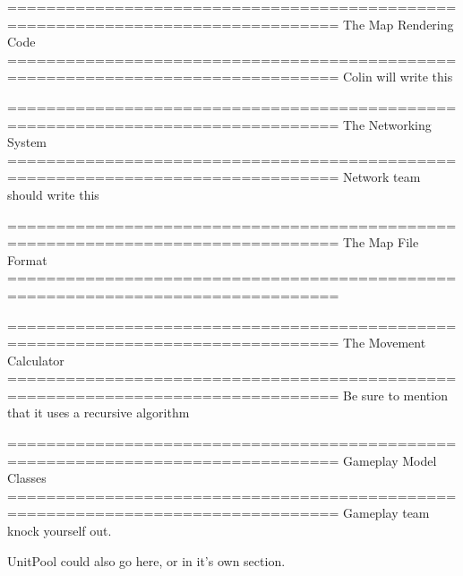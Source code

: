 \documentclass[12pt,a4paper]{article}
\begin{document}
================================================================================
The Map Rendering Code
================================================================================
Colin will write this

================================================================================
The Networking System
================================================================================
Network team should write this

================================================================================
The Map File Format
================================================================================

================================================================================
The Movement Calculator
================================================================================
Be sure to mention that it uses a recursive algorithm

================================================================================
Gameplay Model Classes
================================================================================
Gameplay team knock yourself out.

UnitPool could also go here, or in it's own section.
\end{document}
